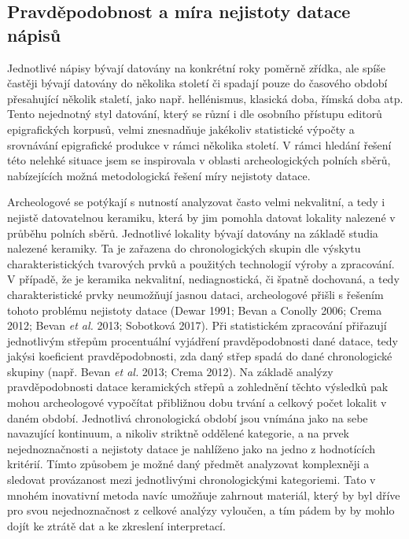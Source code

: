 \subsection[pravděpodobnost-a-míra-nejistoty-datace-nápisů]{Pravděpodobnost a míra nejistoty datace nápisů}

Jednotlivé nápisy bývají datovány na konkrétní roky poměrně zřídka, ale spíše častěji bývají datovány do několika století či spadají pouze do časového období přesahující několik staletí, jako např. hellénismus, klasická doba, římská doba atp. Tento nejednotný styl datování, který se různí i dle osobního přístupu editorů epigrafických korpusů, velmi znesnadňuje jakékoliv statistické výpočty a srovnávání epigrafické produkce v rámci několika století. V rámci hledání řešení této nelehké situace jsem se inspirovala v oblasti archeologických polních sběrů, nabízejících možná metodologická řešení míry nejistoty datace.

Archeologové se potýkají s nutností analyzovat často velmi nekvalitní, a tedy i nejistě datovatelnou keramiku, která by jim pomohla datovat lokality nalezené v průběhu polních sběrů. Jednotlivé lokality bývají datovány na základě studia nalezené keramiky. Ta je zařazena do chronologických skupin dle výskytu charakteristických tvarových prvků a použitých technologií výroby a zpracování. V případě, že je keramika nekvalitní, nediagnostická, či špatně dochovaná, a tedy charakteristické prvky neumožňují jasnou dataci, archeologové přišli s řešením tohoto problému nejistoty datace (Dewar 1991; Bevan a Conolly 2006; Crema 2012; Bevan {\em et al.} 2013; Sobotková 2017). Při statistickém zpracování přiřazují jednotlivým střepům procentuální vyjádření pravděpodobnosti dané datace, tedy jakýsi koeficient pravděpodobnosti, zda daný střep spadá do dané chronologické skupiny (např. Bevan {\em et al.} 2013; Crema 2012). Na základě analýzy pravděpodobnosti datace keramických střepů a zohlednění těchto výsledků pak mohou archeologové vypočítat přibližnou dobu trvání a celkový počet lokalit v daném období. Jednotlivá chronologická období jsou vnímána jako na sebe navazující kontinuum, a nikoliv striktně oddělené kategorie, a na prvek nejednoznačnosti a nejistoty datace je nahlíženo jako na jedno z hodnotících kritérií. Tímto způsobem je možné daný předmět analyzovat komplexněji a sledovat provázanost mezi jednotlivými chronologickými kategoriemi. Tato v mnohém inovativní metoda navíc umožňuje zahrnout materiál, který by byl dříve pro svou nejednoznačnost z celkové analýzy vyloučen, a tím pádem by by mohlo dojít ke ztrátě dat a ke zkreslení interpretací.

